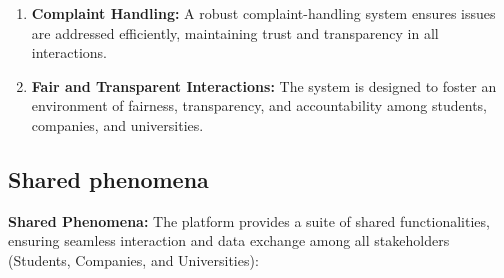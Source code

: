 \begin{enumerate}
    \item \textbf{Complaint Handling:} A robust complaint-handling system ensures issues are addressed efficiently, maintaining trust and transparency in all interactions.

    \item \textbf{Fair and Transparent Interactions:} The system is designed to foster an environment of fairness, transparency, and accountability among students, companies, and universities.
\end{enumerate}
\newpage

\subsection{Shared phenomena}
\label{subsec:shared_phenomena}%
\setcounter{sp}{1}
\newcommand{\csp} {\thesp\stepcounter{sp}}
\textbf{Shared Phenomena:}
The platform provides a suite of shared functionalities, ensuring seamless interaction and data exchange among all stakeholders (Students, Companies, and Universities):
